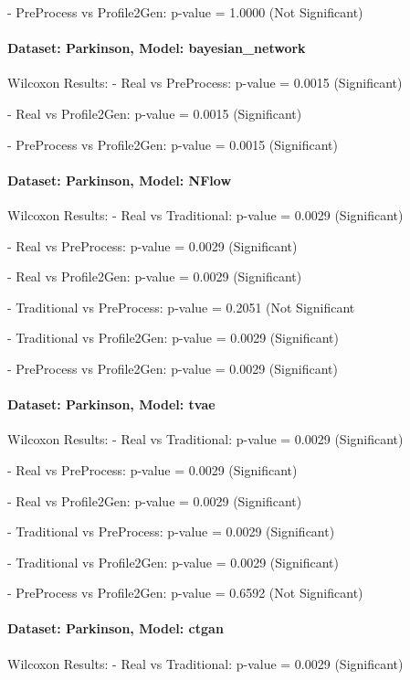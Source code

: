 \documentclass{article}
\theoremstyle{plain}
\theoremstyle{definition}
\theoremstyle{remark}
\begin{document}
- PreProcess vs Profile2Gen: p-value = 1.0000 (Not Significant)



\paragraph{Dataset: Parkinson, Model: bayesian\_network}
Wilcoxon Results:
- Real vs PreProcess: p-value = 0.0015 (Significant)


- Real vs Profile2Gen: p-value = 0.0015 (Significant)


- PreProcess vs Profile2Gen: p-value = 0.0015 (Significant)



\paragraph{Dataset: Parkinson, Model: NFlow}
Wilcoxon Results:
- Real vs Traditional: p-value = 0.0029 (Significant)


- Real vs PreProcess: p-value = 0.0029 (Significant)


- Real vs Profile2Gen: p-value = 0.0029 (Significant)


- Traditional vs PreProcess: p-value = 0.2051 (Not Significant


- Traditional vs Profile2Gen: p-value = 0.0029 (Significant)


- PreProcess vs Profile2Gen: p-value = 0.0029 (Significant)



\paragraph{Dataset: Parkinson, Model: tvae}
Wilcoxon Results:
- Real vs Traditional: p-value = 0.0029 (Significant)


- Real vs PreProcess: p-value = 0.0029 (Significant)


- Real vs Profile2Gen: p-value = 0.0029 (Significant)


- Traditional vs PreProcess: p-value = 0.0029 (Significant)


- Traditional vs Profile2Gen: p-value = 0.0029 (Significant)


- PreProcess vs Profile2Gen: p-value = 0.6592 (Not Significant)



\paragraph{Dataset: Parkinson, Model: ctgan}
Wilcoxon Results:
- Real vs Traditional: p-value = 0.0029 (Significant)
\end{document}
